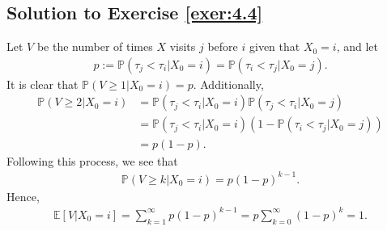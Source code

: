 \documentclass[12pt]{book}
\numberwithin{equation}{chapter}
\theoremstyle{plain}
\numberwithin{theorem}{section}
\theoremstyle{definition}
\numberwithin{exercise}{chapter}
\newcommand{\<}{\langle}
\renewcommand{\>}{\rangle}
\renewcommand{\(}{\left(}
\renewcommand{\)}{\right)}
\renewcommand{\[}{\left[}
\renewcommand{\]}{\right]}
\newcommand\Eb{\mathds{E}}
\newcommand\Pb{\mathds{P}}
\begin{document}
\subsection*{Solution to Exercise \ref{exer:4.4}}
Let $V$ be the number of times $X$ visits $j$ before $i$ given that $X_0 = i$, and let 
\begin{align}
p 
	:= \Pb( \tau_j < \tau_i | X_0=i) 
	= \Pb( \tau_i < \tau_j | X_0=j).
\end{align}
It is clear that $\Pb( V \geq 1 | X_0 = i) = p$. Additionally,
\begin{align}
\Pb( V \geq 2 | X_0 = i)
	&= \Pb( \tau_j < \tau_i | X_0 = i) \Pb (\tau_j < \tau_i |X_0 = j) \\
	&= \Pb( \tau_j < \tau_i | X_0 = i) (1 - \Pb( \tau_i < \tau_j | X_0 =j)) \\
	&= p (1-p).
\end{align}
Following this process, we see that 
\begin{align}
\Pb(V \geq k | X_0 = i)
	= p ( 1- p)^{k-1}. 
\end{align}
Hence, 
\begin{align}
\Eb[ V | X_0 = i]
	= \sum_{k=1}^\infty p ( 1- p)^{k-1}
	= p \sum_{k=0}^\infty (1 - p)^k 
	= 1. 
\end{align}
\end{document}
